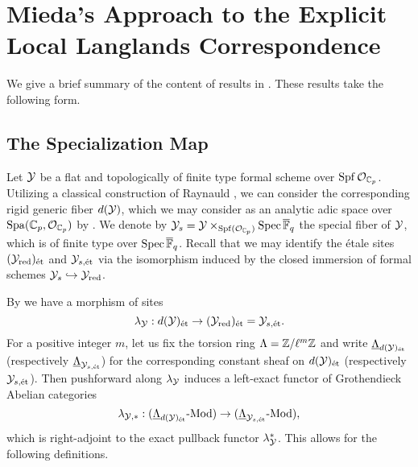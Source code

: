 \documentclass[../main.tex]{subfiles}
\begin{document}
\section{Mieda's Approach to the Explicit Local Langlands Correspondence} %
\label{sec:Mieda's Approach to the Explicit Local Langlands Correspondence}

We give a brief summary of the content of results in \cite{mieda2016geometric}.
These results take the following form. 

\subsection{The Specialization Map} %
\label{sub:The Injectivity FinLevel}
Let $\mathcal{Y}$ be a flat and topologically of finite type formal scheme over $\operatorname{Spf} \mathcal{O}_{\mathbb{C}_p}$.
Utilizing a classical construction of Raynauld \cite{raynaud1974geometrie}, we 
can consider the corresponding rigid generic fiber $d(\mathcal{Y})$, which we may
consider as an analytic adic space over $\operatorname{Spa}({\mathbb{C}_p},\mathcal{O}_{\mathbb{C}_p})$ by \cite[Section
1.9]{huber2013etale}. We denote by $\mathcal{Y}_s = \mathcal{Y} \times_{\operatorname{Spf}(\mathcal{O}_{\mathbb{C}_p})} \operatorname{Spec}
{\overline {\mathbb{F}}_q}$ the special fiber of $\mathcal{Y}$, which is of finite type over $\operatorname{Spec}
{\overline {\mathbb{F}}_q}$. Recall that we may identify the \'etale sites $(\mathcal{Y}_{\mathrm{red}})_{\textnormal{\'et}}$ and
$\mathcal{Y}_{s,\textnormal{\'et}}$ via the isomorphism induced by the closed immersion of formal schemes
$\mathcal{Y}_s \hookrightarrow \mathcal{Y}_{\mathrm{red}}$.

By \cite[Lemma 3.5.1]{huber2013etale} we have a morphism of sites
\begin{equation*}
  \lambda_{\mathcal{Y}} : d(\mathcal{Y})_{\textnormal{\'et}} \to (\mathcal{Y}_{\mathrm{red}})_{\textnormal{\'et}} = \mathcal{Y}_{s, \textnormal{\'et}}.
\end{equation*}
For a positive integer $m$, let us fix the torsion ring $\Lambda = \mathbb{Z}/\ell^m
\mathbb{Z}$ and write $\underline \Lambda_{d(\mathcal{Y})_{\textnormal{\'et}}}$ (respectively $\underline
\Lambda_{\mathcal{Y}_{s, \textnormal{\'et}}}$)
for the corresponding constant sheaf on $d(\mathcal{Y})_{\textnormal{\'et}}$ (respectively $\mathcal{Y}_{s,\textnormal{\'et}}$). Then 
pushforward along $\lambda_{\mathcal{Y}}$ induces a left-exact functor of Grothendieck
Abelian categories
\begin{equation*}
  \lambda_{\mathcal{Y},*}: {({\underline \Lambda_{d(\mathcal{Y})_{\textnormal{\'et}}}}\text-\allowbreak\mathrm{Mod})} \to {({\underline \Lambda_{\mathcal{Y}_{s, \textnormal{\'et}}}}\text-\allowbreak\mathrm{Mod})},
\end{equation*}
which is right-adjoint to the exact pullback functor $\lambda_{\mathcal{Y}}^*$.
This allows for the following definitions.
\end{document}
